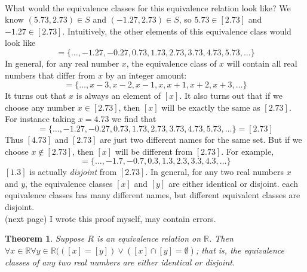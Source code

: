\documentclass{report}
\newtheorem*{theorem}{Theorem}
\theoremstyle{definition}
\begin{document}
\vspace{1mm}\\
What would the equivalence classes for this equivalence relation look like? We know $(5.73,2.73)\in S$ and $(-1.27,2.73)\in S$, so $5.73\in[2.73]$ and $-1.27\in[2.73]$. Intuitively, the other 
elements of this equivalence class would look like
\begin{equation*}
[2.73]=\{\ldots,-1.27,-0.27,0.73,1.73,2.73,3.73,4.73,5.73,\ldots\}
\end{equation*}
In general, for any real number $x$, the equivalence class of $x$ will contain all real numbers that differ from $x$ by an integer amount:
\begin{equation*}
[x]=\{\ldots,x-3,x-2,x-1,x,x+1,x+2,x+3,\ldots\}
\end{equation*}
It turns out that $x$ is always an element of $[x]$. It also turns out that if we choose any number $x\in[2.73]$, then $[x]$ will be exactly the same as $[2.73]$. For instance taking $x=4.73$ we
find that
\begin{equation*}
[4.73]=\{\ldots,-1.27,-0.27,0.73,1.73,2.73,3.73,4.73,5.73,\ldots\}=[2.73]
\end{equation*}
Thus $[4.73]$ and $[2.73]$ are just two different names for the same set. But if we choose $x\notin[2.73]$, then $[x]$ will be different from $[2.73]$. For example,
\begin{equation*}
[1.3]=\{\ldots,-1.7,-0.7,0.3,1.3,2.3,3.3,4.3,\ldots\}
\end{equation*}
$[1.3]$ is actually \textit{disjoint} from $[2.73]$. In general, for any two real numbers $x$ and $y$, the equivalence classes $[x]$ and $[y]$ are either identical or disjoint. each equivalence
classes has many different names, but different equivalent classes are disjoint.\\
(next page)\newpage
\noindent I wrote this proof myself, may contain errors.
\begin{theorem}
Suppose $R$ is an equivalence relation on $\mathbb R$. Then $\forall x\in\mathbb R\forall y\in\mathbb R(([x]=[y])\lor([x]\cap[y]=\emptyset)$; that is, the equivalence classes of any two real
numbers are either identical or disjoint.
\end{theorem}
\end{document}
